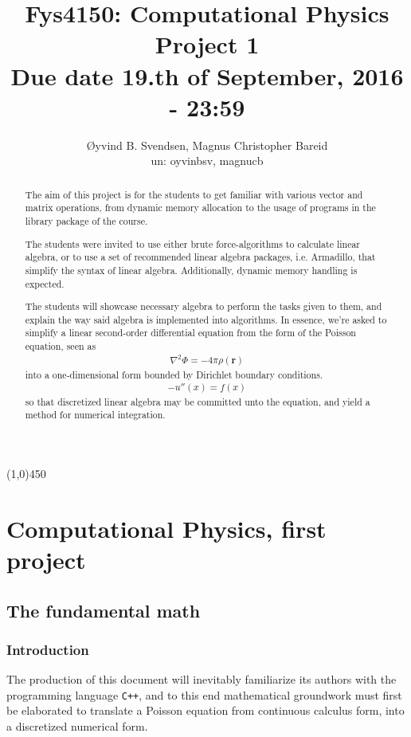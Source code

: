 \documentclass[11pt,a4paper,notitlepage]{article}
\title{\normalsize Fys4150: Computational Physics \\
\vspace{10mm}
\huge Project 1\\
\vspace{10mm}
\normalsize Due date {\bf 19.th of September, 2016 - 23:59}}
\author{Øyvind B. Svendsen, Magnus Christopher Bareid \\ un: oyvinbsv, magnucb}
\begin{document}
\noindent
\maketitle
\vspace{10mm}
\begin{abstract}
The aim of this project is for the students to get familiar with various vector and matrix operations, from dynamic memory allocation to the usage of programs in the library package of the course.

The students were invited to use either brute force-algorithms to calculate linear algebra, or to use a set of recommended linear algebra packages, i.e. Armadillo, that simplify the syntax of linear algebra. Additionally, dynamic memory handling is expected.

The students will showcase necessary algebra to perform the tasks given to them, and explain the way said algebra is implemented into algorithms. In essence, we're asked to simplify a linear second-order differential equation from the form of the Poisson equation, seen as
\begin{align*}
\nabla ^2 \Phi = -4\pi\rho(\mathbf{r})
\end{align*}
into a one-dimensional form bounded by Dirichlet boundary conditions.
\begin{align*}
-u''(x) = f(x)
\end{align*}
so that discretized linear algebra may be committed unto the equation, and yield a method for numerical integration.
\end{abstract}
\begin{center}
\line(1,0){450}
\end{center}

\newpage
\tableofcontents

\newpage
\section{Computational Physics, first project}
\subsection{The fundamental math}
\subsubsection{Introduction}
The production of this document will inevitably familiarize its authors with the programming language \verb|C++|, and to this end mathematical groundwork must first be elaborated to translate a Poisson equation from continuous calculus form, into a discretized numerical form.
\end{document}

